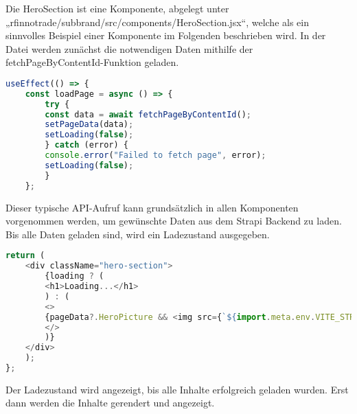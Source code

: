 Die HeroSection ist eine Komponente, abgelegt unter „rfinnotrade/subbrand/src/components/HeroSection.jsx“, welche als ein sinnvolles Beispiel einer Komponente im Folgenden beschrieben wird.
In der Datei werden zunächst die notwendigen Daten mithilfe der fetchPageByContentId-Funktion geladen.

\begin{lstlisting}[language=JavaScript, caption={HeroSection.jsx}, label={lst:herosectionjsx}]
useEffect(() => {
    const loadPage = async () => {
        try {
        const data = await fetchPageByContentId();
        setPageData(data);
        setLoading(false);
        } catch (error) {
        console.error("Failed to fetch page", error);
        setLoading(false);
        }
    };
\end{lstlisting}

Dieser typische API-Aufruf kann grundsätzlich in allen Komponenten vorgenommen werden, um gewünschte Daten aus dem Strapi Backend zu laden.
Bis alle Daten geladen sind, wird ein Ladezustand ausgegeben.

\begin{lstlisting}[language=JavaScript, caption={HeroSection.jsx}, label={lst:herosectionjsx}]
return (
    <div className="hero-section">
        {loading ? (
        <h1>Loading...</h1>
        ) : (
        <>
        {pageData?.HeroPicture && <img src={`${import.meta.env.VITE_STRAPI_BASE_URL}${pageData?.HeroPicture?.url}`} alt="HeaderBild" className="hero-image" />}
        </>
        )} 
    </div>
    );
};
\end{lstlisting}

Der Ladezustand wird angezeigt, bis alle Inhalte erfolgreich geladen wurden. Erst dann werden die Inhalte gerendert und angezeigt.